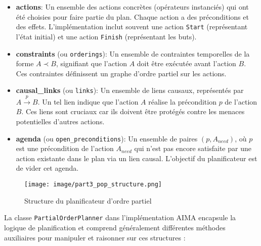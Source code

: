 \documentclass[a4paper,12pt]{report}
\begin{document}
\begin{itemize}
    \item \textbf{actions}: Un ensemble des actions concrètes (opérateurs instanciés) qui ont été choisies pour faire partie du plan. Chaque action a des préconditions et des effets. L'implémentation inclut souvent une action \texttt{Start} (représentant l'état initial) et une action \texttt{Finish} (représentant les buts).
    \item \textbf{constraints} (ou \texttt{orderings}): Un ensemble de contraintes temporelles de la forme \(A \prec B\), signifiant que l'action \(A\) doit être exécutée avant l'action \(B\). Ces contraintes définissent un graphe d'ordre partiel sur les actions.
    \item \textbf{causal\_links} (ou \texttt{links}): Un ensemble de liens causaux, représentés par \(A \xrightarrow{p} B\). Un tel lien indique que l'action \(A\) réalise la précondition \(p\) de l'action \(B\). Ces liens sont cruciaux car ils doivent être protégés contre les menaces potentielles d'autres actions.
    \item \textbf{agenda} (ou \texttt{open\_preconditions}): Un ensemble de paires \((p, A_{need})\), où \(p\) est une précondition de l'action \(A_{need}\) qui n'est pas encore satisfaite par une action existante dans le plan via un lien causal. L'objectif du planificateur est de vider cet agenda.
\end{itemize}

\begin{figure}[H]
    \centering
    \texttt{[image: image/part3\_pop\_structure.png]}
    \caption{Structure du planificateur d'ordre partiel}
\end{figure}

La classe \texttt{PartialOrderPlanner} dans l'implémentation AIMA encapsule la logique de planification et comprend généralement différentes méthodes auxiliaires pour manipuler et raisonner sur ces structures :
\end{document}
